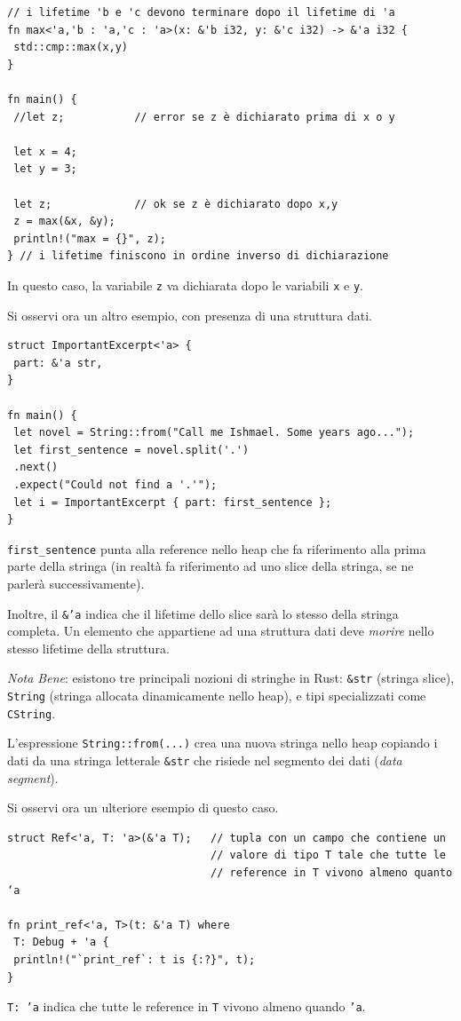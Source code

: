 \documentclass{article}
\begin{document}
\begin{tcolorbox}
\begin{verbatim}
// i lifetime 'b e 'c devono terminare dopo il lifetime di 'a
fn max<'a,'b : 'a,'c : 'a>(x: &'b i32, y: &'c i32) -> &'a i32 {
 std::cmp::max(x,y)
}

fn main() {
 //let z;           // error se z è dichiarato prima di x o y

 let x = 4;
 let y = 3;

 let z;             // ok se z è dichiarato dopo x,y
 z = max(&x, &y);
 println!("max = {}", z);
} // i lifetime finiscono in ordine inverso di dichiarazione
\end{verbatim}
\end{tcolorbox}
In questo caso, la variabile \texttt{z} va dichiarata dopo le variabili \texttt{x} e \texttt{y}.

\pagebreak

Si osservi ora un altro esempio, con presenza di una struttura dati.
\begin{tcolorbox}
\begin{verbatim}
struct ImportantExcerpt<'a> {
 part: &'a str,
}

fn main() {
 let novel = String::from("Call me Ishmael. Some years ago...");
 let first_sentence = novel.split('.')
 .next()
 .expect("Could not find a '.'");
 let i = ImportantExcerpt { part: first_sentence };
}
\end{verbatim}
\end{tcolorbox}
\texttt{first\_sentence} punta alla reference nello heap che fa riferimento alla prima parte della stringa (in realtà fa riferimento ad uno slice della stringa, se ne parlerà successivamente).

Inoltre, il \texttt{\&'a} indica che il lifetime dello slice sarà lo stesso della stringa completa. Un elemento che appartiene ad una struttura dati deve \textit{morire} nello stesso lifetime della struttura.

\textit{Nota Bene}: esistono tre principali nozioni di stringhe in Rust: \texttt{\&str} (stringa slice), \texttt{String} (stringa allocata dinamicamente nello heap), e tipi specializzati come \texttt{CString}. 

L'espressione \texttt{String::from(...)} crea una nuova stringa nello heap copiando i dati da una stringa letterale \texttt{\&str} che risiede nel segmento dei dati (\textit{data segment}).\vspace{8pt}

Si osservi ora un ulteriore esempio di questo caso.
\begin{tcolorbox}
\begin{verbatim}
struct Ref<'a, T: 'a>(&'a T);   // tupla con un campo che contiene un 
                                // valore di tipo T tale che tutte le
                                // reference in T vivono almeno quanto ‘a

fn print_ref<'a, T>(t: &'a T) where
 T: Debug + 'a {
 println!("`print_ref`: t is {:?}", t);
}
\end{verbatim}
\end{tcolorbox}
\texttt{T: 'a} indica che tutte le reference in \texttt{T} vivono almeno quando \texttt{'a}.
\end{document}
